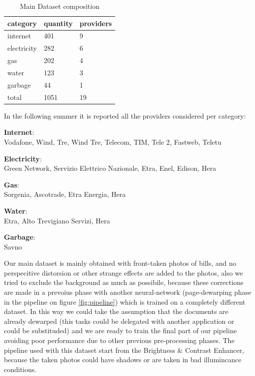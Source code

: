 \documentclass[10pt,twocolumn,letterpaper]{article}
\begin{document}
\begin{table}[!h]
	\begin{center}
		\begin{tabular}{lll}
			\hline
			category    & quantity & providers \\ \hline
			internet    & 401      & 9         \\
			electricity & 282      & 6         \\
			gas         & 202      & 4         \\
			water       & 123      & 3         \\
			garbage     & 44       & 1         \\ \hline
			total       & 1051     & 19        \\ \hline
		\end{tabular}
	\end{center}
	\label{dataset-table}
	\caption{Main Dataset composition}
\end{table}

In the following summer it is reported all the providers considered per category:\\

\begin{itemize}
\end{itemize}

Our main dataset is mainly obtained with front-taken photos of bills, and no perspecitive distorsion or other strange effects are added to the photos, also we tried to exclude the background as much as possibile, because these corrections are made in a prevoius phase with another neural-network (page-dewarping phase in the pipeline on figure \ref{fig:pipeline}) which is trained on a completely different dataset. In this way we could take the assumption that the documents are already dewarped (this tasks could be delegated with another application or could be substituded) and we are ready to train the final part of our pipeline avoiding poor performance due to other previous pre-processing phases. The pipeline used with this dataset start from the Brightness \& Contrast Enhancer, because the taken photos could have shadows or are taken in bad illumincance conditions. \\
\end{document}

